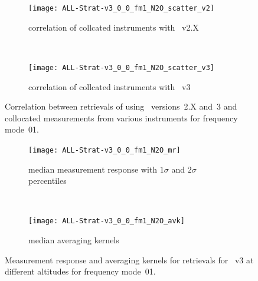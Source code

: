 \begin{figure}[tbhp]
    \centering
    \begin{subfigure}[b]{0.49\textwidth}
        \texttt{[image: ALL-Strat-v3\_0\_0\_fm1\_N2O\_scatter\_v2]}
        \caption{correlation of collcated instruments with \smr~v2.X}
        \label{fig:fm01:N2O:scatter:v2}
    \end{subfigure}
    \,
    \begin{subfigure}[b]{0.49\textwidth}
        \texttt{[image: ALL-Strat-v3\_0\_0\_fm1\_N2O\_scatter\_v3]}
        \caption{correlation of collcated instruments with \smr~v3}
        \label{fig:fm01:N2O:scatter:v3}
    \end{subfigure}
    \caption{Correlation between retrievals of  using \smr\
    versions~2.X and~3 and collocated measurements from various instruments
    for frequency mode~01.}
    \label{fig:fm01:N2O:scatter}
\end{figure}

\begin{figure}[tbhp]
    \centering
    \begin{subfigure}[b]{0.49\textwidth}
        \texttt{[image: ALL-Strat-v3\_0\_0\_fm1\_N2O\_mr]}
        \caption{median measurement response with $1\sigma$ and $2\sigma$
        percentiles}
        \label{fig:fm01:N2O:mr}
    \end{subfigure}
    \,
    \begin{subfigure}[b]{0.49\textwidth}
        \texttt{[image: ALL-Strat-v3\_0\_0\_fm1\_N2O\_avk]}
        \caption{median averaging kernels\newline~}
        \label{fig:fm01:N2O:avk}
    \end{subfigure}
    \caption{Measurement response and averaging kernels for 
    retrievals for \smr~v3 at different altitudes for frequency mode~01.}
    \label{fig:fm01:N2O:mr_avk}
\end{figure}


\newpage
